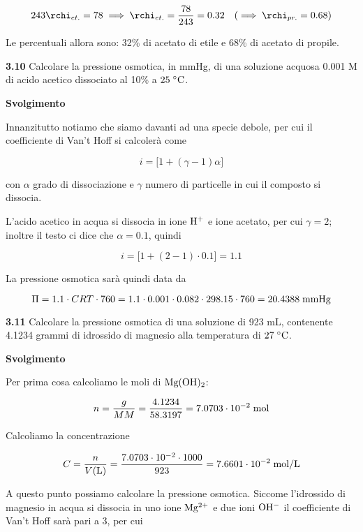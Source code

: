 $$243\rchi_{et.}=78
\implies
\rchi_{et.}=\frac{78}{243}=0.32\quad(\implies \rchi_{pr.}=0.68)$$

Le percentuali allora sono: 32\% di acetato di etile e 68\% di acetato di propile.

\vspace{0.2cm}\textbf{3.10} Calcolare la pressione osmotica, in mmHg, di una soluzione acquosa 0.001 M di acido acetico dissociato al 10\% a $25 \; ^{\circ} \rm C$.

\vspace{0.2cm}\large\textbf{Svolgimento}\normalsize

\vspace{0.2cm}Innanzitutto notiamo che siamo davanti ad una specie debole, per cui il coefficiente di Van't Hoff si calcolerà come

$$i=\big[1 + (\gamma -1)\alpha\big]$$

con $\alpha$ grado di dissociazione e $\gamma$ numero di particelle in cui il composto si dissocia.

L'acido acetico in acqua si dissocia in ione $\rm H^+$ e ione acetato, per cui $\gamma=2$; inoltre il testo ci dice che $\alpha=0.1$, quindi

$$i=\big[1 + (2-1) \cdot 0.1\big]=1.1$$

La pressione osmotica sarà quindi data da

$$\Pi=1.1 \cdot CRT \cdot 760
=1.1 \cdot 0.001 \cdot 0.082 \cdot 298.15 \cdot 760=20.4388 \; \rm mmHg$$

\vspace{0.2cm}\textbf{3.11} Calcolare la pressione osmotica di una soluzione di 923 mL, contenente 4.1234 grammi di idrossido di magnesio alla temperatura di $27 \; \rm ^{\circ} C$.

\vspace{0.2cm}\large\textbf{Svolgimento}\normalsize

\vspace{0.2cm}Per prima cosa calcoliamo le moli di $\rm Mg(OH)_2$:

$$n=\frac{g}{MM}=\frac{4.1234}{58.3197}=7.0703 \cdot 10^{-2} \; \rm mol$$

Calcoliamo la concentrazione

$$C=\frac{n}{V(\text{L})}
=\frac{7.0703 \cdot 10^{-2} \cdot 1000}{923}
=7.6601 \cdot 10^{-2} \; \rm mol/L$$

A questo punto possiamo calcolare la pressione osmotica. Siccome l'idrossido di magnesio in acqua si dissocia in uno ione $\rm Mg^{2+}$ e due ioni $\rm OH^-$ il coefficiente di Van't Hoff sarà pari a 3, per cui

